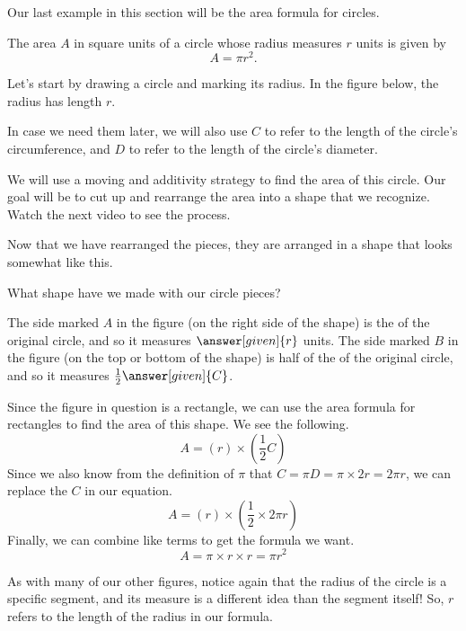 \documentclass{ximera}
\begin{document}
Our last example in this section will be the area formula for circles.
\begin{theorem}
The area $A$ in square units of a circle whose radius measures $r$ units is given by
\[
A = \pi r^2.
\]
\end{theorem}
\begin{explanation}
Let's start by drawing a circle and marking its radius. In the figure below, the radius has length $r$.
\begin{image}
\end{image}
In case we need them later, we will also use $C$ to refer to the length of the circle's circumference, and $D$ to refer to the length of the circle's diameter.

We will use a moving and additivity strategy to find the area of this circle. Our goal will be to cut up and rearrange the area into a shape that we recognize. Watch the next video to see the process.


Now that we have rearranged the pieces, they are arranged in a shape that looks somewhat like this.
\begin{image}
\end{image}


What shape have we made with our circle pieces?
\begin{multipleChoice}
\end{multipleChoice}
The side marked $A$ in the figure (on the right side of the shape) is the  of the original circle, and so it measures $\answer[given]{r}$ units. The side marked $B$ in the figure (on the top or bottom of the shape) is half of the  of the original circle, and so it measures $\frac{1}{2} \answer[given]{C}$.

Since the figure in question is a rectangle, we can use the area formula for rectangles to find the area of this shape. We see the following.
\[
A = (r) \times \left ( \frac12 C \right )
\]
Since we also know from the definition of $\pi$ that $C = \pi D = \pi \times 2r = 2\pi r$, we can replace the $C$ in our equation.
\[
A = (r) \times \left (\frac12 \times 2 \pi r \right )
\]
Finally, we can combine like terms to get the formula we want.
\[
A = \pi \times r \times r = \pi r^2
\]

\end{explanation}
As with many of our other figures, notice again that the radius of the circle is a specific segment, and its measure is a different idea than the segment itself! So, $r$ refers to the length of the radius in our formula.
\end{document}
